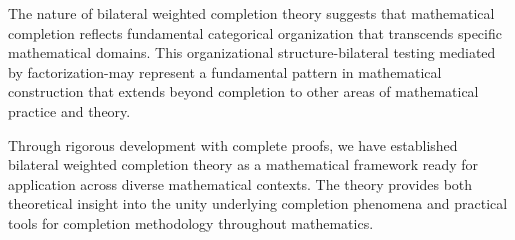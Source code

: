 \documentclass[11pt]{article}
\theoremstyle{plain}
\theoremstyle{definition}
\theoremstyle{remark}
\begin{document}
The nature of bilateral weighted completion theory suggests that mathematical completion reflects fundamental categorical organization that transcends specific mathematical domains. This organizational structure-bilateral testing mediated by factorization-may represent a fundamental pattern in mathematical construction that extends beyond completion to other areas of mathematical practice and theory.

Through rigorous development with complete proofs, we have established bilateral weighted completion theory as a mathematical framework ready for application across diverse mathematical contexts. The theory provides both theoretical insight into the unity underlying completion phenomena and practical tools for completion methodology throughout mathematics.


\end{document}

